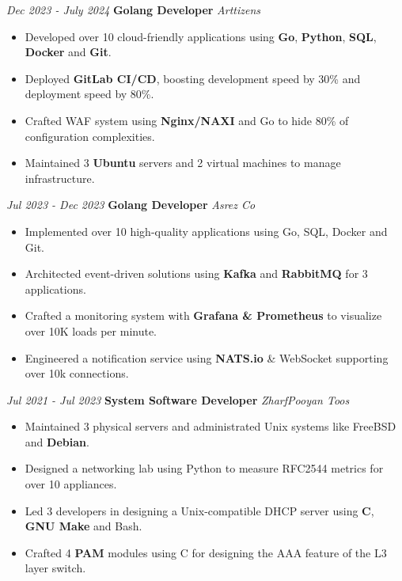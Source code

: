 \documentclass{engineercv}
\begin{document}
\begin{twocolentry}{\textit{Dec 2023 - July 2024}}
  \textbf{Golang Developer}
  \textit{Arttizens}
\end{twocolentry}

\begin{itemize}
  \item Developed over 10 cloud-friendly applications using \textbf{Go}, \textbf{Python}, \textbf{SQL}, \textbf{Docker} and \textbf{Git}.
  \item Deployed \textbf{GitLab CI/CD}, boosting development speed by 30\% and deployment speed by 80\%.
  \item Crafted WAF system using \textbf{Nginx/NAXI} and Go to hide 80\% of configuration complexities.
  \item Maintained 3 \textbf{Ubuntu} servers and 2 virtual machines to manage infrastructure.
\end{itemize}

\begin{twocolentry}{\textit{Jul 2023 - Dec 2023}}
  \textbf{Golang Developer}
  \textit{Asrez Co}
\end{twocolentry}

\begin{itemize}
  \item Implemented over 10 high-quality applications using Go, SQL, Docker and Git.
  \item Architected event-driven solutions  using \textbf{Kafka} and \textbf{RabbitMQ} for 3 applications.
  \item Crafted a monitoring system with \textbf{Grafana \& Prometheus} to visualize over 10K loads per minute.
  \item Engineered a notification service using \textbf{NATS.io} \& WebSocket supporting over 10k connections.
\end{itemize}

\begin{twocolentry}{\textit{Jul 2021 - Jul 2023}}
  \textbf{System Software Developer}
  \textit{ZharfPooyan Toos}
\end{twocolentry}

\begin{itemize}
  \item Maintained 3 physical servers and administrated Unix systems like FreeBSD and \textbf{Debian}.
  \item Designed a networking lab using Python to measure RFC2544 metrics for over 10 appliances.
  \item Led 3 developers in designing a Unix-compatible DHCP server using \textbf{C}, \textbf{GNU Make} and Bash.
  \item Crafted 4 \textbf{PAM} modules using C for designing the AAA feature of the L3 layer switch.
\end{itemize}
\end{document}
